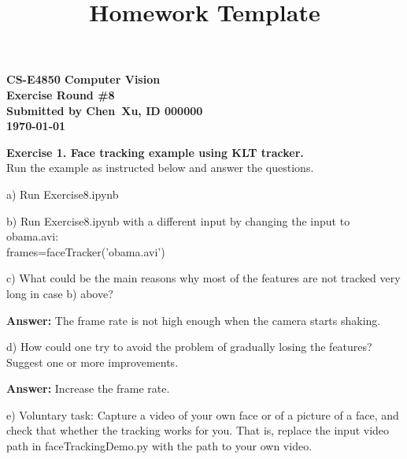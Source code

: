 \documentclass[letterpaper, 11pt]{article}
\begin{document}
\title{Homework Template}

\begin{center}
    {
        \large
        \bf
        CS-E4850 Computer Vision\\
        Exercise Round \#8\\
        Submitted by Chen\ Xu, ID 000000\\
        \today
    }
\end{center}
\bigskip
\textbf{Exercise 1. Face tracking example using KLT tracker.}\\
Run the example as instructed below and answer the questions.

a) Run Exercise8.ipynb

b) Run Exercise8.ipynb with a different input by changing the input to obama.avi: \\frames=faceTracker('obama.avi')

c) What could be the main reasons why most of the features are not tracked very long in case b) above?

\textbf{Answer:} The frame rate is not high enough when the camera starts shaking.

d) How could one try to avoid the problem of gradually losing the features? Suggest one or more improvements.

\textbf{Answer:} Increase the frame rate.

e) Voluntary task: Capture a video of your own face or of a picture of a face, and check that whether the tracking works for you. That is, replace the input video path in faceTrackingDemo.py with the path to your own video.
\end{document}
